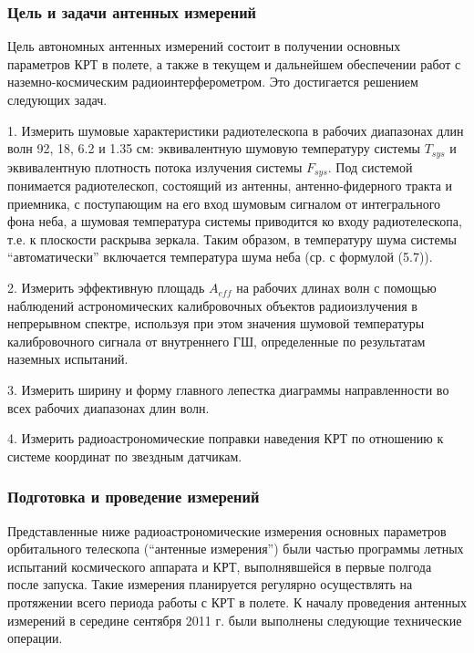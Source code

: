 \subsubsection{Цель и задачи антенных измерений}


Цель автономных антенных измерений состоит в получении основных
параметров КРТ в полете, а также в текущем и дальнейшем обеспечении работ
с наземно-космическим радиоинтерферометром.
Это достигается решением следующих задач.

1. Измерить шумовые характеристики радиотелескопа в рабочих диапазонах
длин волн 92, 18, 6.2 и 1.35 см: эквивалентную шумовую температуру системы
$T_{sys}$ и эквивалентную плотность потока излучения системы $F_{sys}$.
Под системой понимается радиотелескоп, состоящий из антенны, антенно-фидерного тракта и
приемника, с поступающим на его вход шумовым сигналом от интегрального фона неба,
а шумовая температура системы приводится ко входу радиотелескопа, т.е. к плоскости
раскрыва зеркала. Таким образом, в температуру шума системы ``автоматически''
включается температура шума неба (ср. с формулой (5.7)).

2. Измерить эффективную площадь $A_{eff}$ на рабочих длинах волн с помощью
наблюдений астрономических калибровочных объектов радиоизлучения в непрерывном
спектре, используя при этом значения шумовой температуры
калибровочного сигнала от внутреннего ГШ,
определенные по результатам наземных испытаний.

3. Измерить ширину и форму главного лепестка диаграммы направленности
во всех рабочих диапазонах длин волн.

4. Измерить радиоастрономические поправки наведения КРТ по отношению к
системе координат по звездным датчикам.


\subsubsection{Подготовка и проведение измерений}


Представленные ниже радиоастрономические измерения основных параметров
орбитального телескопа (``антенные измерения'') были частью
программы летных испытаний космического аппарата и КРТ,
выполнявшейся в первые полгода после запуска.
Такие измерения планируется регулярно осуществлять на протяжении всего
периода работы с КРТ в полете. К началу проведения антенных измерений
в середине сентября 2011 г. были выполнены следующие технические
операции.

